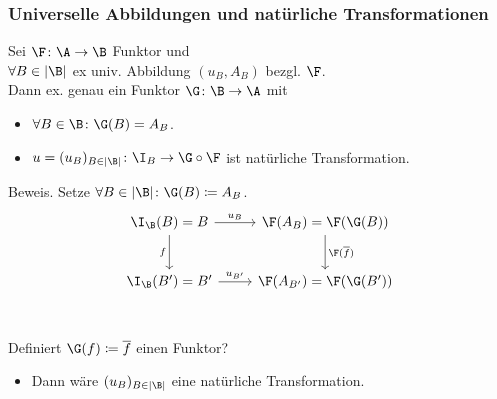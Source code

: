 \begin{frame}[fragile]
  \frametitle{Universelle Abbildungen und natürliche Transformationen}
  \begin{thm*}
    Sei $\F \colon \A \to \B$ Funktor und \\
    $\forall B \in |\B|$ ex univ. Abbildung $(u_B, A_B)$ bezgl. $\F$. \\
    Dann ex. genau ein Funktor $\G \colon \B \to \A$ mit
    \pause
    \begin{itemize}
      \item $\forall B \in \B \colon \G(B) = A_B$.
      \item $u = (u_B)_{B \in |\B|} \colon \I_B \to \G \circ \F$ ist natürliche Transformation.
    \end{itemize}
  \end{thm*}
  \pause

  \begin{block}{Beweis.}
  Setze $\forall B \in |\B| \colon \G(B) \coloneqq A_B$.
    \pause
    $$
    \begin{tikzcd}[row sep=2.5em]
      \I_\B(B)  = B \arrow[r,"u_B"] \arrow[d,"f"'] & \F(A_B)     = \F(\G(B)) \arrow[d,"\F(\overline f)"] 
      \\ 
      \I_\B(B') = B'\arrow[r,"u_{B'}"]              & \F(A_{B'})  = \F(\G(B')) \\
    \end{tikzcd}
    $$
    \pause
    Definiert $\G(f) \coloneqq \overline f$ einen Funktor? 
    \begin{itemize}
      \item Dann w\"are $(u_B)_{B \in |\B|}$ eine nat\"urliche Transformation.
    \end{itemize}
  \end{block}
\end{frame}

